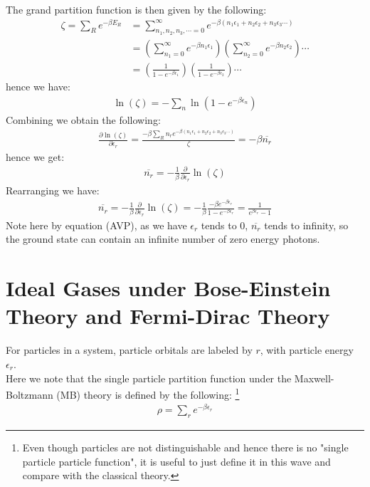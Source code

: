 \documentclass[11pt,oneside]{book}
\theoremstyle{break}
\theoremstyle{break}
\begin{document}
The grand partition function is then given by the following:
\begin{align*}
\zeta 
= \sum_{R} e^{-\beta E_R} &= \sum_{n_1,n_2,n_3,\cdots = 0}^{\infty} e^{-\beta ( n_1 \epsilon_1 + n_2 \epsilon_2 + n_3 \epsilon_3\cdots)}\\
&= \left( \sum_{n_1 = 0}^\infty e^{-\beta n_1 \epsilon_1}\right) \left( \sum_{n_2 = 0}^\infty e^{-\beta n_2 \epsilon_2}\right)\cdots \\ 
&= \left( \frac{1}{1-e^{-\beta \epsilon_1}}\right)\left( \frac{1}{1-e^{-\beta \epsilon_2}}\right)\cdots
\end{align*}
hence we have:
\begin{align*}
\ln(\zeta) = -\sum_n \ln(1- e^{-\beta \epsilon_n})
\end{align*}
Combining we obtain the following:
\begin{align*}
\frac{\partial \ln(\zeta)}{\partial \epsilon_r} = \frac{-\beta \sum_{R} n_r e^{-\beta (n_1 \epsilon_1 + n_2 \epsilon_2 + n_3 \epsilon_3\cdots )}}{\zeta} = -\beta \overline{n_r}
\end{align*}
hence we get:
\begin{align*}
\overline{n_r} = -\frac{1}{\beta} \frac{\partial}{\partial \epsilon_r} \ln(\zeta)
\end{align*}
Rearranging we have:
\begin{align*}
\overline{n_r} = -\frac{1}{\beta} \frac{\partial }{\partial \epsilon_r} \ln(\zeta) = - \frac{1}{\beta}\frac{-\beta e^{-\beta \epsilon_r}}{1 - e^{-\beta \epsilon_r}} = \frac{1}{e^{\beta \epsilon_r} - 1} \tag{AVP}
\end{align*}
Note here by equation (AVP), as we have $\epsilon_r$ tends to $0$, $\overline{n_r}$ tends to infinity, so the ground state can contain an infinite number of zero energy photons. \\
\newpage


\section[Ideal Gases under Bose-Einstein Theory and Fermi-Dirac Theory]{\color{red}Ideal Gases under Bose-Einstein Theory and Fermi-Dirac Theory\color{black}}
For particles in a system, particle orbitals are labeled by $r$, with particle energy $\epsilon_r$. \\
Here we note that the single particle partition function under the Maxwell-Boltzmann (MB) theory is defined by the following: \footnote{Even though particles are not distinguishable and hence there is no "single particle particle function", it is useful to just define it in this wave and compare with the classical theory.}
\begin{align*}
\rho = \sum_r e^{-\beta \epsilon_r}
\end{align*}
\end{document}
